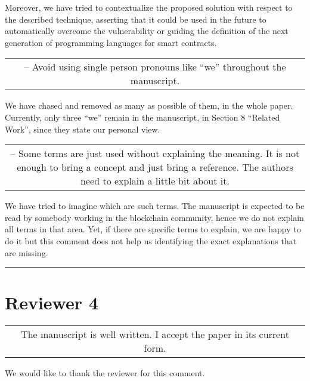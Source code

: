 \documentclass[journal,onecolumn, 11pt]{IEEEtran}
\newcommand{\BOX}[1]
{
  {\it
    \begin{center}
      \begin{tabular}{|c|}
        \hline
        \parbox{0.97\columnwidth}{
          \medskip
          #1
          \medskip} \\
        \hline
      \end{tabular}
    \end{center}
  }
}
\begin{document}
Moreover, we have tried to contextualize the proposed solution with respect to the described technique, asserting that it could be used in the future to automatically overcome the vulnerability or guiding the definition of the next generation of programming languages for smart contracts.

\BOX{9 -- Avoid using single person pronouns like ``we'' throughout the manuscript.} We have chased and removed as many as possible of them, in the whole paper. Currently, only three ``we'' remain in the manuscript, in Section 8 ``Related Work'', since they state our personal view.

\BOX{10 -- Some terms are just used without explaining the meaning. It is not enough to bring a concept and just bring a reference. The authors need to explain a little bit about it.}

We have tried to imagine which are such terms. The manuscript is expected to be read by somebody working in the blockchain community, hence we do not explain all terms in that area. Yet, if there are specific terms to explain, we are happy to do it but this comment does not help us identifying the exact explanations that are missing.

\vspace{5mm}
\hrule
\section*{\textbf{Reviewer 4}}

\BOX{The manuscript is well written.  I accept the paper in its current form.
}

We would like to thank the reviewer for this comment.
\end{document}
